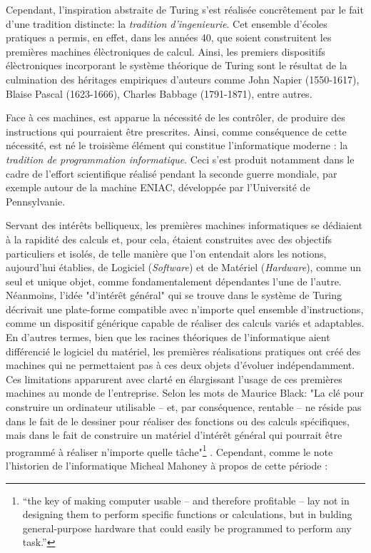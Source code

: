 Cependant, l'inspiration abstraite de Turing s'est réalisée concrêtement par le fait d'une tradition distincte: la \emph{tradition d'ingenieurie}. Cet ensemble d'écoles pratiques a permis, en effet, dans les années 40, que soient construitent les premières machines élèctroniques de calcul. Ainsi, les premiers dispositifs élèctroniques incorporant le système théorique de Turing sont le résultat de la culmination des héritages empiriques d'auteurs comme John Napier (1550-1617), Blaise Pascal (1623-1666), Charles Babbage (1791-1871), entre autres.

Face à ces machines, est apparue la nécessité de les contrôler, de produire des instructions qui pourraient être prescrites. Ainsi, comme conséquence de cette nécessité, est né le troisième élément qui constitue l'informatique moderne : la \emph{tradition de programmation informatique}. Ceci s'est produit notamment dans le cadre de l'effort scientifique réalisé pendant la seconde guerre mondiale, par exemple autour de la machine ENIAC, développée par l'Université de Pennsylvanie.

Servant des intérêts belliqueux, les premières machines informatiques se dédiaient à la rapidité des calculs et, pour cela, étaient construites avec des objectifs particuliers et isolés, de telle manière que l'on entendait alors les notions, aujourd'hui établies, de Logiciel (\emph{Software}) et de Matériel (\emph{Hardware}), comme un seul et unique objet, comme fondamentalement dépendantes l'une de l'autre. Néanmoins, l'idée "d'intérêt général" qui se trouve dans le système de Turing décrivait une plate-forme compatible avec n'importe quel ensemble d'instructions, comme un dispositif générique capable de réaliser des calculs variés et adaptables. En d'autres termes, bien que les racines théoriques de l'informatique aient différencié le logiciel du matériel, les premières réalisations pratiques ont créé des machines qui ne permettaient pas à ces deux objets d'évoluer indépendamment. Ces limitations apparurent avec clarté en élargissant l'usage de ces premières machines au monde de l'entreprise. Selon les mots de Maurice Black: "La clé pour construire un ordinateur utilisable -- et, par conséquence, rentable -- ne réside pas dans le fait de le dessiner pour réaliser des fonctions ou des calculs spécifiques, mais dans le fait de construire un matériel d'intérêt général qui pourrait être programmé à réaliser n'importe quelle tâche"\footnote{“the key of making computer usable – and therefore profitable – lay not in designing them to perform specific functions or calculations, but in bulding general-purpose hardware that could easily be programmed to perform any task.”} \citep[p.40]{Black2002}.
Cependant, comme le note l'historien de l'informatique Micheal Mahoney à propos de cette période :

